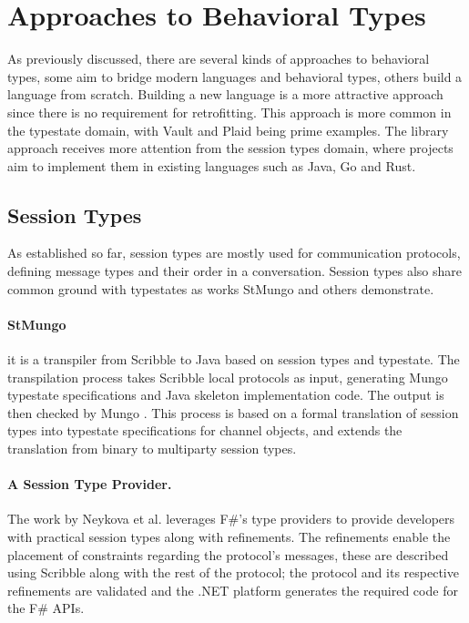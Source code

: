 \section{Approaches to Behavioral Types}\label{sec:behavioral-approaches}

As previously discussed, there are several kinds of approaches to behavioral types,
some aim to bridge modern languages and behavioral types,
others build a language from scratch.
Building a new language is a more attractive approach since there is no requirement for retrofitting.
This approach is more common in the typestate domain, with Vault and Plaid being prime examples.
The library approach receives more attention from the session types domain,
where projects aim to implement them in existing languages such as Java, Go and Rust.

\subsection{Session Types}
As established so far, session types are mostly used for communication protocols,
defining message types and their order in a conversation.
Session types also share common ground with typestates as works StMungo \autocite{Dardha2017, Kouzapas2018, Voinea2020}
and others \autocite{Gay2015, Vasconcelos2017} demonstrate.

\paragraph{StMungo} it is a transpiler from Scribble \autocite{Yoshida2014} to Java based on session types and typestate.
The transpilation process takes Scribble local protocols as input, generating Mungo typestate specifications and Java skeleton implementation code.
The output is then checked by Mungo \autocite{Dardha2017, Kouzapas2018, Voinea2020}.
This process is based on a formal translation of session types into typestate specifications for channel objects, and
extends the translation from binary to multiparty session types.

\paragraph{A Session Type Provider.}
The work by Neykova et al. \autocite{Neykova2018} leverages F\#'s type providers to provide developers with practical session types along with refinements.
The refinements enable the placement of constraints regarding the protocol's messages,
these are described using Scribble \autocite{Yoshida2014} along with the rest of the protocol;
the protocol and its respective refinements are validated and the .NET platform generates the required code for the F\# \gls{API}s.

